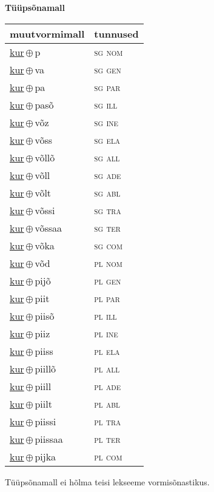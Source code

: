 

\vspace{3.5em}
\noindent \begin{minipage}{\textwidth}
\noindent \textbf{Tüüpsõnamall \,}\\

\begin{sideways}
\begin{tabular}{l l}
muutvormimall & tunnused \\
\hline
\underline{kur}\,$\oplus$\,p & \textsc{ sg nom } \\
\underline{kur}\,$\oplus$\,va & \textsc{ sg gen } \\
\underline{kur}\,$\oplus$\,pa & \textsc{ sg par } \\
\underline{kur}\,$\oplus$\,pasõ & \textsc{ sg ill } \\
\underline{kur}\,$\oplus$\,võz & \textsc{ sg ine } \\
\underline{kur}\,$\oplus$\,võss & \textsc{ sg ela } \\
\underline{kur}\,$\oplus$\,võllõ & \textsc{ sg all } \\
\underline{kur}\,$\oplus$\,võll & \textsc{ sg ade } \\
\underline{kur}\,$\oplus$\,võlt & \textsc{ sg abl } \\
\underline{kur}\,$\oplus$\,võssi & \textsc{ sg tra } \\
\underline{kur}\,$\oplus$\,võssaa & \textsc{ sg ter } \\
\underline{kur}\,$\oplus$\,võka & \textsc{ sg com } \\
\underline{kur}\,$\oplus$\,võd & \textsc{ pl nom } \\
\underline{kur}\,$\oplus$\,pijõ & \textsc{ pl gen } \\
\underline{kur}\,$\oplus$\,piit & \textsc{ pl par } \\
\underline{kur}\,$\oplus$\,piisõ & \textsc{ pl ill } \\
\underline{kur}\,$\oplus$\,piiz & \textsc{ pl ine } \\
\underline{kur}\,$\oplus$\,piiss & \textsc{ pl ela } \\
\underline{kur}\,$\oplus$\,piillõ & \textsc{ pl all } \\
\underline{kur}\,$\oplus$\,piill & \textsc{ pl ade } \\
\underline{kur}\,$\oplus$\,piilt & \textsc{ pl abl } \\
\underline{kur}\,$\oplus$\,piissi & \textsc{ pl tra } \\
\underline{kur}\,$\oplus$\,piissaa & \textsc{ pl ter } \\
\underline{kur}\,$\oplus$\,pijka & \textsc{ pl com } \\
\end{tabular}
\end{sideways}
\label{tab:tüüpsõnamall-kurp}

\end{minipage}

 
\vspace{1em}
\noindent Tüüpsõnamall  ei hõlma teisi lekseeme vormi\-sõnastikus.

